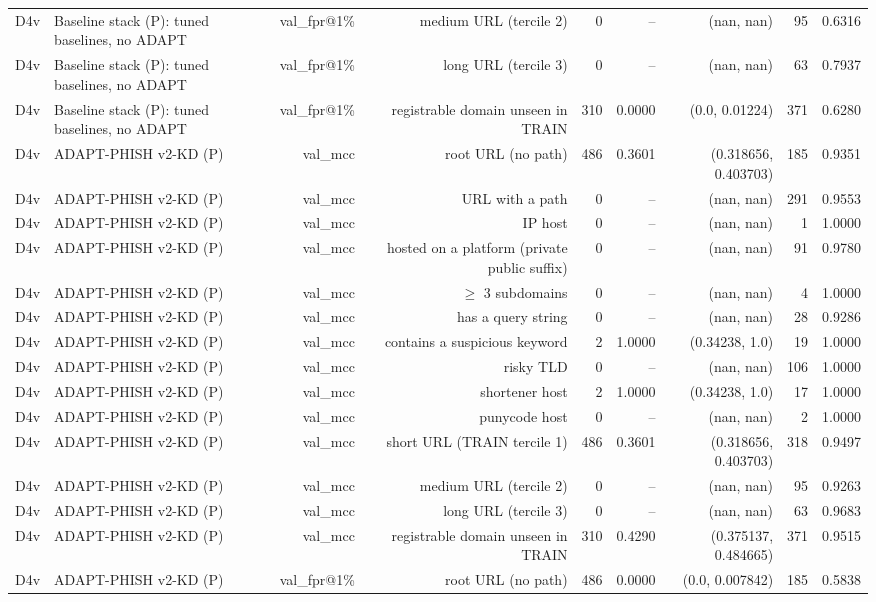 \begin{table}[t]
\begin{tabular}{llrrrrrrr}
D4v & Baseline stack (P): tuned baselines, no ADAPT & val\_fpr@1\% & medium URL (tercile 2) & 0 & -- & (nan, nan) & 95 & 0.6316 \\
D4v & Baseline stack (P): tuned baselines, no ADAPT & val\_fpr@1\% & long URL (tercile 3) & 0 & -- & (nan, nan) & 63 & 0.7937 \\
D4v & Baseline stack (P): tuned baselines, no ADAPT & val\_fpr@1\% & registrable domain unseen in TRAIN & 310 & 0.0000 & (0.0, 0.01224) & 371 & 0.6280 \\
D4v & ADAPT-PHISH v2-KD (P) & val\_mcc & root URL (no path) & 486 & 0.3601 & (0.318656, 0.403703) & 185 & 0.9351 \\
D4v & ADAPT-PHISH v2-KD (P) & val\_mcc & URL with a path & 0 & -- & (nan, nan) & 291 & 0.9553 \\
D4v & ADAPT-PHISH v2-KD (P) & val\_mcc & IP host & 0 & -- & (nan, nan) & 1 & 1.0000 \\
D4v & ADAPT-PHISH v2-KD (P) & val\_mcc & hosted on a platform (private public suffix) & 0 & -- & (nan, nan) & 91 & 0.9780 \\
D4v & ADAPT-PHISH v2-KD (P) & val\_mcc & $\geq$ 3 subdomains & 0 & -- & (nan, nan) & 4 & 1.0000 \\
D4v & ADAPT-PHISH v2-KD (P) & val\_mcc & has a query string & 0 & -- & (nan, nan) & 28 & 0.9286 \\
D4v & ADAPT-PHISH v2-KD (P) & val\_mcc & contains a suspicious keyword & 2 & 1.0000 & (0.34238, 1.0) & 19 & 1.0000 \\
D4v & ADAPT-PHISH v2-KD (P) & val\_mcc & risky TLD & 0 & -- & (nan, nan) & 106 & 1.0000 \\
D4v & ADAPT-PHISH v2-KD (P) & val\_mcc & shortener host & 2 & 1.0000 & (0.34238, 1.0) & 17 & 1.0000 \\
D4v & ADAPT-PHISH v2-KD (P) & val\_mcc & punycode host & 0 & -- & (nan, nan) & 2 & 1.0000 \\
D4v & ADAPT-PHISH v2-KD (P) & val\_mcc & short URL (TRAIN tercile 1) & 486 & 0.3601 & (0.318656, 0.403703) & 318 & 0.9497 \\
D4v & ADAPT-PHISH v2-KD (P) & val\_mcc & medium URL (tercile 2) & 0 & -- & (nan, nan) & 95 & 0.9263 \\
D4v & ADAPT-PHISH v2-KD (P) & val\_mcc & long URL (tercile 3) & 0 & -- & (nan, nan) & 63 & 0.9683 \\
D4v & ADAPT-PHISH v2-KD (P) & val\_mcc & registrable domain unseen in TRAIN & 310 & 0.4290 & (0.375137, 0.484665) & 371 & 0.9515 \\
D4v & ADAPT-PHISH v2-KD (P) & val\_fpr@1\% & root URL (no path) & 486 & 0.0000 & (0.0, 0.007842) & 185 & 0.5838 \\

\end{tabular}
\end{table}
